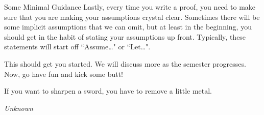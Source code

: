 \begin{section}{Some Minimal Guidance}
Lastly, every time you write a proof, you need to make sure that you are making your assumptions crystal clear.  Sometimes there will be some implicit assumptions that we can omit, but at least in the beginning, you should get in the habit of stating your assumptions up front.  Typically, these statements will start off ``Assume\ldots" or ``Let\ldots".  

This should get you started.  We will discuss more as the semester progresses.  Now, go have fun and kick some butt!

\epigraph{If you want to sharpen a sword, you have to remove a little metal.}{\emph{Unknown}}

\end{section}